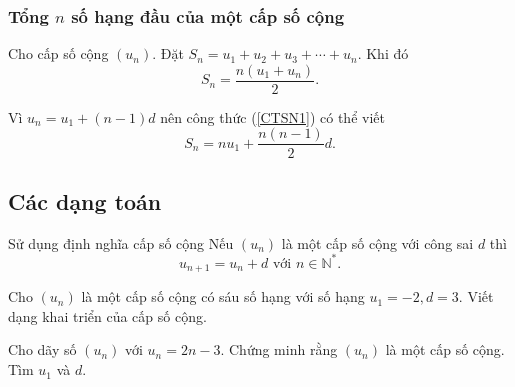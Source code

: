 \subsubsection{Tổng $n$ số hạng đầu của một cấp số cộng}
\begin{dl}
	Cho cấp số cộng $(u_n)$. Đặt $S_n=u_1+u_2+u_3+\cdots +u_n$. Khi đó
	\begin{equation}\label{CTSN1}
	S_n=\dfrac{n(u_1+u_n)}{2}.
	\end{equation}
\end{dl}
\begin{note}
	Vì $u_n=u_1+(n-1)d$ nên công thức (\ref{CTSN1}) có thể viết
	\begin{equation}\label{CTSN2}
	S_n=nu_1+\dfrac{n(n-1)}{2}d.
	\end{equation}
\end{note}





\subsection{Các dạng toán}
\begin{dang}{Sử dụng định nghĩa cấp số cộng}
	Nếu $(u_n)$ là một cấp số cộng với công sai $d$ thì $$u_{n+1}=u_n + d \text{ với } n\in \mathbb{N^*}.$$
\end{dang}
\begin{vd}%
	Cho $(u_n)$ là một cấp số cộng có sáu số hạng với số hạng $u_1=-2, d=3$. Viết dạng khai triển của cấp số cộng.
\end{vd}

\begin{vd}%
	Cho dãy số $(u_n)$ với $u_n = 2n-3$. Chứng minh rằng $(u_n)$ là một cấp số cộng. Tìm $u_1$ và $d$.
\end{vd}

